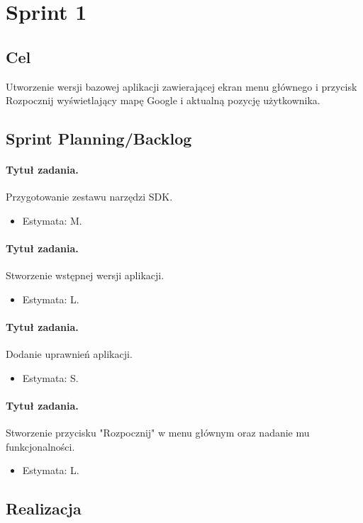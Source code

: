 \documentclass[a4paper]{article}
\begin{document}
\section{Sprint 1}
\subsection{Cel} Utworzenie wersji bazowej aplikacji zawierającej ekran menu głównego i przycisk Rozpocznij wyświetlający mapę Google i aktualną pozycję użytkownika.
\subsection{Sprint Planning/Backlog}

\paragraph{Tytuł zadania.} Przygotowanie zestawu narzędzi SDK.
\begin{itemize}
\item Estymata: M.
\end{itemize}

\paragraph{Tytuł zadania.} Stworzenie wstępnej wersji aplikacji.
\begin{itemize}
\item Estymata: L.
\end{itemize}

\paragraph{Tytuł zadania.} Dodanie uprawnień aplikacji.
\begin{itemize}
\item Estymata: S.
\end{itemize}

\paragraph{Tytuł zadania.} Stworzenie przycisku "Rozpocznij" w menu głównym oraz nadanie mu funkcjonalności.
\begin{itemize}
\item Estymata: L.
\end{itemize}

\subsection{Realizacja} %
\end{document}
